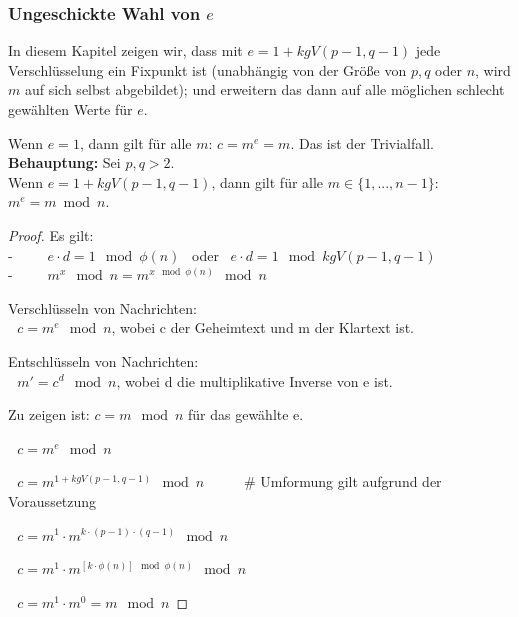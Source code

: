 \begin{refsegment}
\vspace{15pt}
\subsubsection{Ungeschickte Wahl von \texorpdfstring{$e$}{e}}%

In diesem Kapitel zeigen wir, dass mit $e=1+kgV(p-1,q-1)$ jede Verschlüsselung ein
Fixpunkt ist (unabhängig von der Größe von $p, q$ oder $n$, wird $m$ auf sich selbst abgebildet);
und erweitern das dann auf alle möglichen schlecht gewählten Werte für $e$.

 Wenn $e=1$, dann gilt für alle $ m$: $ c = m^e = m$. Das ist der Trivialfall.\\

\textbf{Behauptung:} Sei $p,q > 2$.\\
Wenn $e=1+kgV(p-1,q-1)$, dann gilt für alle $ m \in \{1,...,n-1\}$: $ m^e = m \bmod n$.

\begin{proof}{}
Es gilt:\\
-~~~ $ ~~~ e\cdot d=1 \mod \phi(n)$ ~oder~ $e\cdot d=1 \mod kgV(p-1,q-1) $\\
-~~~ $ ~~~ m^{x} \mod n = m^{x \mod \phi(n)} \mod n $

 Verschlüsseln von Nachrichten:\\
 $~~~c=m^e \mod n$, wobei c der Geheimtext und m der Klartext ist.

 Entschlüsseln von Nachrichten:\\
 $~~~m'=c^d \mod n$, wobei d die multiplikative Inverse von e ist.

 Zu zeigen ist: $c=m \mod n$ für das gewählte e.

$~~~c = m^e \mod n$

$~~~c = m^{1+kgV(p-1,q-1)} \mod n$  ~~~~~\# Umformung gilt aufgrund der Voraussetzung

$~~~c = m^1 \cdot m^{k \cdot (p-1) \cdot (q-1)} \mod n$

$~~~c = m^1 \cdot m^{[k \cdot \phi(n)] \mod \phi(n)} \mod n$

$~~~c = m^1 \cdot m^{0} = m \mod n $
\end{proof}


\end{refsegment}
